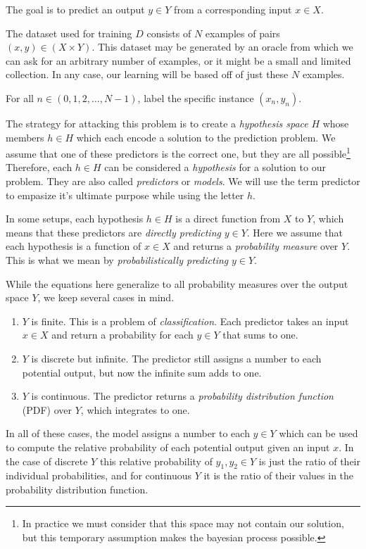\documentclass[twoside]{article}
\begin{document}
The goal is to predict an output \(y \in Y\) from a corresponding input \(x \in X\).

The dataset used for training \(D\) consists of \(N\) examples of pairs \((x, y) \in (X \times Y) \).  This dataset may be generated by an oracle from which we can ask for an arbitrary number of examples, or it might be a small and limited collection. In any case, our learning will be based off of just these \(N\) examples.

For all \(n \in (0, 1, 2,\ldots,N-1)\), label the specific instance \((x_n, y_n)\).

The strategy for attacking this problem is to create a \textit{hypothesis space} \(H\) whose members \(h \in H\) which each encode a solution to the prediction problem. We assume that one of these predictors is the correct one, but they are all possible\footnote{In practice we must consider that this space may not contain our solution, but this temporary assumption makes the bayesian process possible.} Therefore, each \(h \in H\) can be considered a \textit{hypothesis} for a solution to our problem. They are also called \textit{predictors} or \textit{models}. We will use the term predictor to empasize it's ultimate purpose while using the letter \(h\).

In some setups, each hypothesis \(h \in H\) is a direct function from \(X\) to \(Y\), which means that these predictors are \textit{directly predicting} \(y \in Y\). Here we assume that each hypothesis is a function of \(x \in X\) and returns a \textit{probability measure} over \(Y\). This is what we mean by \textit{probabilistically predicting} \(y \in Y\).

While the equations here generalize to all probability measures over the output space \(Y\), we keep several cases in mind.
\begin{enumerate}
	\item \(Y\) is finite. This is a problem of \textit{classification}. Each predictor takes an input \(x \in X\) and return a probability for each \(y \in Y\) that sums to one.
	\item \(Y\) is discrete but infinite. The predictor still assigns a number to each potential output, but now the infinite sum adds to one.
	\item \(Y\) is continuous. The predictor returns a \textit{probability distribution function} (PDF) over \(Y\), which integrates to one.
\end{enumerate}

In all of these cases, the model assigns a number to each \(y \in Y\) which can be used to compute the relative probability of each potential output given an input \(x\). In the case of discrete \(Y\) this relative probability of \(y_1, y_2 \in Y\) is just the ratio of their individual probabilities, and for continuous \(Y\) it is the ratio of their values in the probability distribution function. 
\end{document}
